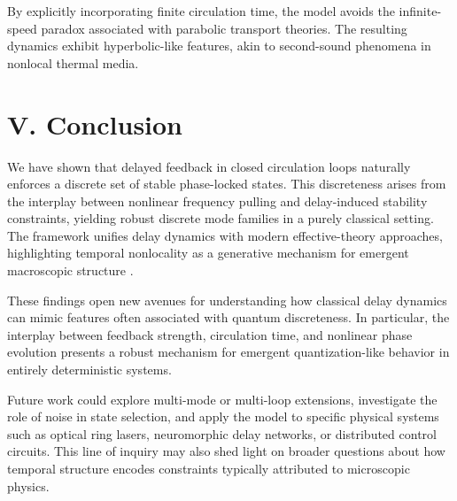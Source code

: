 \documentclass[11pt,a4paper]{article}
\begin{document}
By explicitly incorporating finite circulation time, the model avoids the infinite-speed paradox associated with parabolic transport theories. The resulting dynamics exhibit hyperbolic-like features, akin to second-sound phenomena in nonlocal thermal media.

\section*{V. Conclusion}
We have shown that delayed feedback in closed circulation loops naturally enforces a discrete set of stable phase-locked states. This discreteness arises from the interplay between nonlinear frequency pulling and delay-induced stability constraints, yielding robust discrete mode families in a purely classical setting. The framework unifies delay dynamics with modern effective-theory approaches, highlighting temporal nonlocality as a generative mechanism for emergent macroscopic structure \cite{Masoller2002}.


\medskip


\noindent

These findings open new avenues for understanding how classical delay dynamics can mimic features often associated with quantum discreteness. In particular, the interplay between feedback strength, circulation time, and nonlinear phase evolution presents a robust mechanism for emergent quantization-like behavior in entirely deterministic systems.


Future work could explore multi-mode or multi-loop extensions, investigate the role of noise in state selection, and apply the model to specific physical systems such as optical ring lasers, neuromorphic delay networks, or distributed control circuits. This line of inquiry may also shed light on broader questions about how temporal structure encodes constraints typically attributed to microscopic physics.
\end{document}
